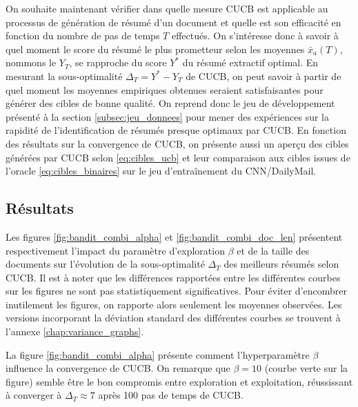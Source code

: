 On souhaite maintenant vérifier dans quelle mesure CUCB est applicable 
au processus de génération de résumé d'un document et 
quelle est son efficacité en fonction du nombre de pas de temps $T$ effectués.
On s'intéresse donc à savoir à quel moment le score du résumé le plus prometteur 
selon les moyennes $\bar{x}_a(T)$, nommons le $Y_T$,
se rapproche du score $Y^*$ du résumé extractif optimal.
En mesurant la sous-optimalité $\Delta_T = Y^* - Y_T$ de CUCB, 
on peut savoir à partir de quel moment les moyennes empiriques
obtenues seraient satisfaisantes pour générer des cibles de bonne qualité.
On reprend donc le jeu de développement présenté à la section \ref{subsec:jeu_donnees} 
pour mener des expériences sur la rapidité de l'identification de 
résumés presque optimaux par CUCB.
En fonction des résultats sur la convergence de CUCB, 
on présente aussi un aperçu des cibles générées par CUCB selon \eqref{eq:cibles_ucb}
et leur comparaison aux cibles issues de l'oracle \eqref{eq:cibles_binaires}
sur le jeu d'entraînement du CNN/DailyMail.

\subsection{Résultats}
\label{subsec:ucb_resultats}

Les figures \ref{fig:bandit_combi_alpha} et \ref{fig:bandit_combi_doc_len}
présentent respectivement l'impact du paramètre d'exploration $\beta$ et de la taille
des documents sur l'évolution de la sous-optimalité $\Delta_T$ des meilleurs 
résumés selon CUCB.
Il est à noter que les différences rapportées entre les différentes 
courbes sur les figures ne sont pas statistiquement significatives.
Pour éviter d'encombrer inutilement les figures, on rapporte alors 
seulement les moyennes observées.
Les versions incorporant la déviation standard des différentes courbes 
se trouvent à l'annexe \ref{chap:variance_graphs}.

La figure \ref{fig:bandit_combi_alpha} présente comment l'hyperparamètre $\beta$ influence la
convergence de CUCB.
On remarque que $\beta=10$ (courbe verte sur la figure) semble être le bon compromis entre exploration et exploitation,
réussissant à converger à $\Delta_T \approx 7$ après 100 pas de temps de CUCB.


